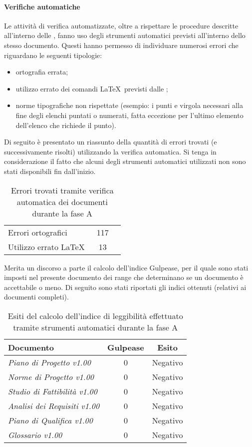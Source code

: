 \documentclass[../PianoDiQualifica.tex]{subfiles}
\begin{document}
\begin{appendices}
			\paragraph{Verifiche automatiche}
			Le attività di verifica automatizzate, oltre a rispettare le procedure descritte all'interno delle \normediprogettov, fanno uso degli strumenti automatici previsti all'interno dello stesso documento. Questi hanno permesso di individuare numerosi errori che riguardano le seguenti tipologie:
			\begin{itemize}
				\item ortografia errata;
				\item utilizzo errato dei comandi \LaTeX\ previsti dalle \normediprogettov;
				\item norme tipografiche non rispettate (esempio: i punti e virgola necessari alla fine degli elenchi puntati o numerati, fatta eccezione per l'ultimo elemento dell'elenco che richiede il punto).
			\end{itemize}
			Di seguito è presentato un riassunto della quantità di errori trovati (e successivamente risolti) utilizzando la verifica automatica. Si tenga in considerazione il fatto che alcuni degli strumenti automatici utilizzati non sono stati disponibili fin dall'inizio.
\begin{table}[H]
		\centering
		\begin{tabular}{l * {2}{c}}
			\midrule
			Errori ortografici &	117 \\
			Utilizzo errato \LaTeX\ & 13 \\
			\midrule
		\end{tabular}
		\caption{Errori trovati tramite verifica automatica dei documenti durante la fase A}
		\label{tab:errori_automatica}
\end{table}	
			Merita un discorso a parte il calcolo dell'indice Gulpease, per il quale sono stati imposti nel presente documento dei range che determinano se un documento è accettabile o meno. Di seguito sono stati riportati gli indici ottenuti (relativi ai documenti completi).
\begin{table}[H]
		\centering
		\begin{tabular}{l * {2}{c}}
			\toprule
			\textbf{Documento} & \textbf{Gulpease} & \textbf{Esito} \\
			\midrule
			\textit{Piano di Progetto v1.00} & 0 &  Negativo \\
			\textit{Norme di Progetto v1.00} & 0 & Negativo \\
			\textit{Studio di Fattibilità v1.00} & 0 & Negativo \\
			\textit{Analisi dei Requisiti v1.00} & 0 & Negativo \\
			\textit{Piano di Qualifica v1.00} & 0 & Negativo \\
			\textit{Glossario v1.00} & 0 & Negativo \\
			\bottomrule
		\end{tabular}
		\caption{Esiti del calcolo dell’indice di leggibilità effettuato tramite strumenti automatici durante la fase A}
		\label{tab:esiti_gulpease}
\end{table}

\end{appendices}
\end{document}

